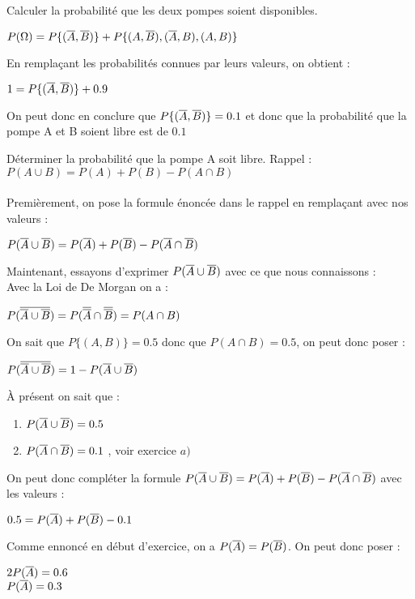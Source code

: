 \begin{exo}
\begin{subexo}{Calculer la probabilité que les deux pompes soient disponibles.}
    \begin{center}$P(\Omega) = P\{(\overline{A},\overline{B})\} + P\{(A,\overline{B}),(\overline{A},B),(A,B)\}$\end{center}
    En remplaçant les probabilités connues par leurs valeurs, on obtient :
    \begin{center}$1 = P\{(\overline{A},\overline{B})\} + 0.9$\end{center}
    On peut donc en conclure que $P\{(\overline{A},\overline{B})\}  = 0.1$ et donc que la probabilité que la pompe A et B soient libre est de $0.1$
  \end{subexo}
\begin{subexo}{Déterminer la probabilité que la pompe A soit libre.}
  Rappel : $P(A\cup B) = P(A) + P(B) - P(A \cap B)$ \\ \\
  Premièrement, on pose la formule énoncée dans le rappel en remplaçant avec nos valeurs :
  \begin{center}$P(\overline{A}\cup \overline{B}) = P(\overline{A}) + P(\overline{B}) - P(\overline{A} \cap \overline{B})$\end{center}
  Maintenant, essayons d'exprimer $P(\overline{A}\cup \overline{B})$ avec ce que nous connaissons : \\
  Avec la Loi de De Morgan on a :
  \begin{center}$P(\overline{\overline{A}\cup \overline{B}}) = P(\overline{\overline{A}} \cap \overline{\overline{B}}) = P(A \cap B)$\end{center}
  On sait que $P\{(A,B)\}=0.5$ donc que $P(A \cap B)=0.5$, on peut donc poser :
  \begin{center}$P(\overline{\overline{A}\cup \overline{B}}) = 1 - P(\overline{A} \cup \overline{B})$\end{center}
  À présent on sait que :
  \begin{enumerate}
    \item[ ] $P(\overline{A} \cup \overline{B}) = 0.5$
    \item[ ] $P(\overline{A} \cap \overline{B}) = 0.1$ , voir exercice $a)$
  \end{enumerate}
  On peut donc compléter la formule $P(\overline{A}\cup \overline{B}) = P(\overline{A}) + P(\overline{B}) - P(\overline{A} \cap \overline{B})$ avec les valeurs :
  \begin{center}
    $0.5 = P(\overline{A}) + P(\overline{B}) - 0.1$
  \end{center}
  Comme ennoncé en début d'exercice, on a $P(\overline{A}) = P(\overline{B})$. On peut donc poser :
  \begin{center}
    $2P(\overline{A}) = 0.6$ \\ $P(\overline{A}) = 0.3$

\end{center}
\end{subexo}
\end{exo}
